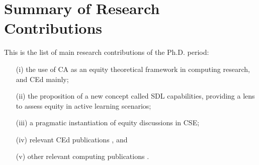 \section{Summary of Research Contributions}
\label{intro-sec:sum-contributions}

This is the list of main research contributions of the \gls{Ph.D.} period:
\begin{enumerate}
    \item[(i)] the use of \gls{CA} as an equity theoretical framework in computing research, and \gls{CEd} mainly;
    \item[(ii)] the proposition of a new concept called \gls{SDL} capabilities, providing a lens to assess equity in active learning scenarios;
    \item[(iii)] a pragmatic instantiation of equity discussions in \gls{CSE};
    \item[(iv)] relevant \gls{CEd} publications \cite{bispojr:2024-isdls,bispojr:2024-nmp,bispojr:2024-urca,   feitosa:2024,cavalcanti:2024,pereira:2024,melo:2024-horizontes,boaventura:2024-sbgames,boaventura:2023,esmeraldo:2023,freire:2023-rsc,freire:2023-encompif, santos:2022,bispojr:2022-educomp,esmeraldo:2022,bispojr:2021,bispojr:2021-educomp,bispojr:2021-wei,bispojr:2020-tec}, and
    \item[(v)] other relevant computing publications \cite{bispojr:2024-online-lab,cavalcanti:2024-ieee,bispojr:2023-edi,bispojr:2023-rbie,sansil:2023,bispojr:2022-snee,lima:2022}.
\end{enumerate}

                

        

        
